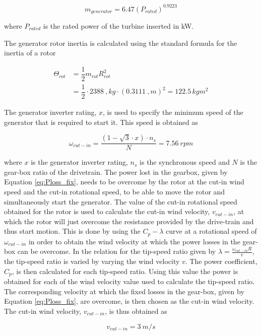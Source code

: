 \begin{equation}
    m_{generator} = 6.47 \left(P_{rated}\right)^{0.9223}
\end{equation}

where $P_{rated}$ is the rated power of the turbine inserted in kW. 

The generator rotor inertia is calculated using the standard formula for the inertia of a rotor

\begin{align}
\Theta_{rot} &= \dfrac{1}{2}m_{rot}R_{rot}^2 \\
&= \dfrac{1}{2}\cdot 2388\ ,kg \cdot (0.3111 \ ,m)^2 = 122.5 \, kgm^2 \nonumber
\end{align}

The generator inverter rating, $x$, is used to specify the minimum speed of the generator that is required to start it. This speed is obtained as

\begin{equation}
    \omega_{cut-in} = \dfrac{(1- \sqrt{3}\cdot x)\cdot n_s}{N}= 7.56\ rpm
\label{eq:cut-in_speed}
\end{equation}

where $x$ is the generator inverter rating, $n_s$ is the synchronous speed and $N$ is the gear-box ratio of the drivetrain. 
The power lost in the gearbox, given by Equation \ref{eq:Ploss_fix}, needs to be overcome by the rotor at the cut-in wind speed and the cut-in rotational speed, to be able to move the rotor and simultaneously start the generator. The value of the cut-in rotational speed obtained for the rotor is used to calculate the cut-in wind velocity, $v_{cut-in}$, at which the rotor will just overcome the resistance provided by the drive-train and thus start motion. This is done by using the $C_p-\lambda$ curve at a rotational speed of $\omega_{cut-in}$ in order to obtain the wind velocity at which the power losses in the gear-box can be overcome.
In the relation for the tip-speed ratio given by $\lambda= \frac{\omega_{cut-in} R}{v}$, the tip-speed ratio is varied by varying the wind velocity $v$. The power coefficient, $C_p$, is then calculated for each tip-speed ratio. Using this value the power is obtained for each of the wind velocity value used to calculate the tip-speed ratio. The corresponding velocity at which the fixed losses in the gear-box, given by Equation \ref{eq:Ploss_fix}, are overcome, is then chosen as the cut-in wind velocity.
The cut-in wind velocity, $v_{cut-in}$, is thus obtained as

\begin{equation}
    v_{cut-in} = 3\ m/s
\label{eq:cut-in_wind_vel}
\end{equation}

